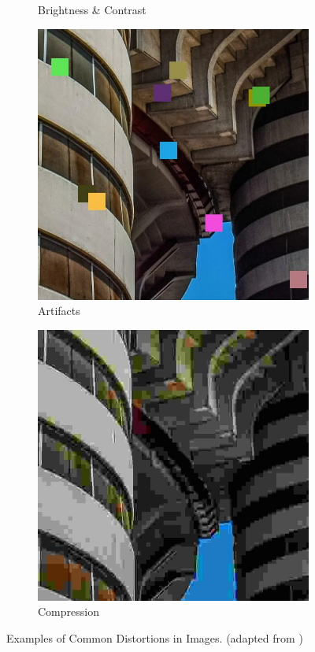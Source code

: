 \begin{figure}[ht]
\begin{subfigure}[b]{0.24\textwidth}
        \caption{Brightness \& Contrast}
        \label{fig:brightness_contrast}
    \end{subfigure}
    \hfill
    \begin{subfigure}[b]{0.24\textwidth}
        \includegraphics[width=\textwidth]{img/Artifacts.jpg}
        \caption{Artifacts}
        \label{fig:artifacts}
    \end{subfigure}
    \hfill
    \begin{subfigure}[b]{0.24\textwidth}
        \includegraphics[width=\textwidth]{img/Compression.jpg}
        \caption{Compression}
        \label{fig:compression}
    \end{subfigure}
    \caption{Examples of Common Distortions in Images. (adapted from \autocite{ARNIQA})}
    \label{fig:distortions}
\end{figure}
